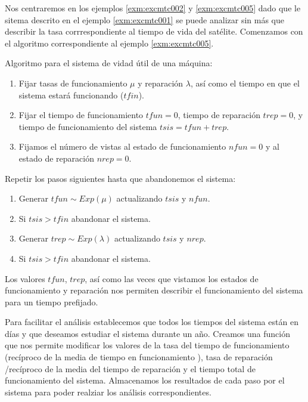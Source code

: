\documentclass[
]{book}
\providecommand{\tightlist}{%
  \setlength{\itemsep}{0pt}\setlength{\parskip}{0pt}}
\newenvironment{silverbox}{
  \definecolor{shadecolor}{rgb}{192, 192, 192}  
  \color{black}
  \begin{shaded}}
 {\end{shaded}}
\theoremstyle{definition}
\theoremstyle{definition}
\theoremstyle{definition}
\theoremstyle{definition}
\theoremstyle{remark}
\begin{document}
Nos centraremos en los ejemplos \ref{exm:excmtc002} y \ref{exm:excmtc005} dado que le sitema descrito en el ejemplo \ref{exm:excmtc001} se puede analizar sin más que describir la tasa corrrespondiente al tiempo de vida del satélite. Comenzamos con el algoritmo correspondiente al ejemplo \ref{exm:excmtc005}.

\begin{silverbox}
Algoritmo para el sistema de vidad útil de una máquina:

\begin{enumerate}
\def\labelenumi{\arabic{enumi}.}
\tightlist
\item
  Fijar tasas de funcionamiento \(\mu\) y reparación \(\lambda\), así como el tiempo en que el sistema estará funcionando (\(tfin\)).
\item
  Fijar el tiempo de funcionamiento \(tfun = 0\), tiempo de reparación \(trep = 0\), y tiempo de funcionamiento del sistema \(tsis = tfun + trep\).
\item
  Fijamos el número de vistas al estado de funcionamiento \(nfun = 0\) y al estado de reparación \(nrep =0\).
\end{enumerate}

Repetir los pasos siguientes hasta que abandonemos el sistema:

\begin{enumerate}
\def\labelenumi{\arabic{enumi}.}
\setcounter{enumi}{2}
\tightlist
\item
  Generar \(tfun \sim Exp(\mu)\) actualizando \(tsis\) y \(nfun\).
\item
  Si \(tsis > tfin\) abandonar el sistema.
\item
  Generar \(trep \sim Exp(\lambda)\) actualizando \(tsis\) y \(nrep\).
\item
  Si \(tsis > tfin\) abandonar el sistema.
\end{enumerate}

Los valores \(tfun\), \(trep\), así como las veces que vistamos los estados de funcionamiento y reparación nos permiten describir el funcionamiento del sistema para un tiempo prefijado.

\end{silverbox}

Para facilitar el análisis establecemos que todos los tiempos del sistema están en días y que deseamos estudiar el sistema durante un año. Creamos una función que nos permite modificar los valores de la tasa del tiempo de funcionamiento (recíproco de la media de tiempo en funcionamiento ), tasa de reparación /recíproco de la media del tiempo de reparación y el tiempo total de funcionamiento del sistema. Almacenamos los resultados de cada paso por el sistema para poder realziar los análisis correspondientes.
\end{document}
